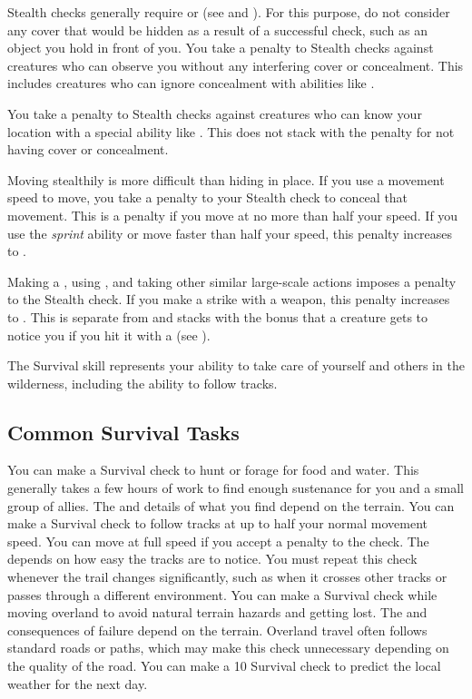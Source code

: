     Stealth checks generally require  or  (see  and ).
    For this purpose, do not consider any cover that would be hidden as a result of a successful check, such as an object you hold in front of you.
    You take a  penalty to Stealth checks against creatures who can observe you without any interfering cover or concealment.
    This includes creatures who can ignore concealment with abilities like .

    You take a  penalty to Stealth checks against creatures who can know your location with a special ability like .
    This does not stack with the penalty for not having cover or concealment.

    Moving stealthily is more difficult than hiding in place.
    If you use a movement speed to move, you take a penalty to your Stealth check to conceal that movement.
    This is a  penalty if you move at no more than half your speed.
    If you use the \textit{sprint} ability or move faster than half your speed, this penalty increases to .

    Making a , using , and taking other similar large-scale actions imposes a  penalty to the Stealth check.
    If you make a strike with a  weapon, this penalty increases to .
    This is separate from and stacks with the  bonus that a creature gets to notice you if you hit it with a  (see ).

\newpage
{}
  The Survival skill represents your ability to take care of yourself and others in the wilderness, including the ability to follow tracks.

  \subsection{Common Survival Tasks}
     You can make a Survival check to hunt or forage for food and water.
    This generally takes a few hours of work to find enough sustenance for you and a small group of allies.
    The  and details of what you find depend on the terrain.
     You can make a Survival check to follow tracks at up to half your normal movement speed.
    You can move at full speed if you accept a  penalty to the check.
    The  depends on how easy the tracks are to notice.
    You must repeat this check whenever the trail changes significantly, such as when it crosses other tracks or passes through a different environment.
     You can make a Survival check while moving overland to avoid natural terrain hazards and getting lost.
    The  and consequences of failure depend on the terrain.
    Overland travel often follows standard roads or paths, which may make this check unnecessary depending on the quality of the road.
     You can make a  10 Survival check to predict the local weather for the next day.


